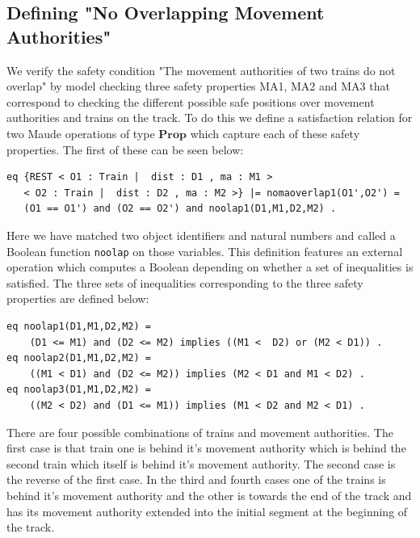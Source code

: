\subsection*{Defining "No Overlapping Movement Authorities"}
We verify the safety condition "The movement authorities of two trains do not overlap" by model checking three safety properties MA1, MA2 and MA3 that correspond to checking the different possible safe positions over movement authorities and trains on the track. To do this we define a satisfaction relation for two Maude operations of type $\mathbf{Prop}$ which capture each of these safety properties. The first of these can be seen below:

\begin{lstlisting}[caption = The no overlapping movement authorities property]
eq {REST < O1 : Train |  dist : D1 , ma : M1 > 
   < O2 : Train |  dist : D2 , ma : M2 >} |= nomaoverlap1(O1',O2') = 
   (O1 == O1') and (O2 == O2') and noolap1(D1,M1,D2,M2) .
\end{lstlisting}

Here we have matched two object identifiers and natural numbers and called a Boolean function \texttt{noolap} on those variables. This definition features an external operation which computes a Boolean depending on whether a set of inequalities is satisfied. The three sets of inequalities corresponding to the three safety properties are defined below:

\begin{lstlisting}[caption = The no overlap operations]
eq noolap1(D1,M1,D2,M2) = 
    (D1 <= M1) and (D2 <= M2) implies ((M1 <  D2) or (M2 < D1)) .  
eq noolap2(D1,M1,D2,M2) = 
    ((M1 < D1) and (D2 <= M2)) implies (M2 < D1 and M1 < D2) .
eq noolap3(D1,M1,D2,M2) = 
    ((M2 < D2) and (D1 <= M1)) implies (M1 < D2 and M2 < D1) .

\end{lstlisting}

There are four possible combinations of trains and movement authorities.  The first case is that train one is behind it's movement authority which is behind the second train which itself is behind it's movement authority. The second case is the reverse of the first case. In the third and fourth cases  one of the trains is behind it's movement authority and the other is towards the end of the track and has its movement authority extended into the initial segment at the beginning of the track.


